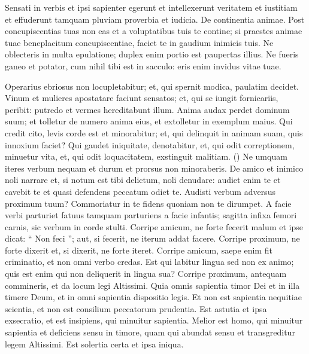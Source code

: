 \begin{biblechapter}
\begin{biblechapter}
\begin{biblechapter}
\begin{biblechapter}
\begin{biblechapter}
\begin{biblechapter}
\begin{biblechapter}
\begin{biblechapter}
\begin{biblechapter}
\begin{biblechapter}
\begin{biblechapter}
\begin{biblechapter}
\begin{biblechapter}
\begin{biblechapter}
\begin{biblechapter}
\begin{biblechapter}
\begin{biblechapter}
\begin{biblechapter}
 \verse Sensati in verbis et ipsi sapienter egerunt
 et intellexerunt veritatem et iustitiam
 et effuderunt tamquam pluviam proverbia et iudicia.
 \verse De continentia animae.
 Post concupiscentias tuas non eas
 et a voluptatibus tuis te contine;
 \verse si praestes animae tuae beneplacitum concupiscentiae,
 faciet te in gaudium inimicis tuis.
 \verse Ne oblecteris in multa epulatione;
 duplex enim portio est paupertas illius.
 \verse Ne fueris ganeo et potator,
 cum nihil tibi est in sacculo:
 eris enim invidus vitae tuae.
 
\begin{biblechapter}
\verse Operarius ebriosus non locupletabitur;
 et, qui spernit modica, paulatim decidet.
 \verse Vinum et mulieres apostatare faciunt sensatos;
 et, qui se iungit fornicariis, peribit:
 putredo et vermes hereditabunt illum.
 \verse Anima audax perdet dominum suum;
 et tolletur de numero anima eius,
 et extolletur in exemplum maius.
 \verse Qui credit cito, levis corde est et minorabitur;
 et, qui delinquit in animam suam, quis innoxium faciet?
 \verse Qui gaudet iniquitate, denotabitur,
 et, qui odit correptionem, minuetur vita,
 et, qui odit loquacitatem, exstinguit malitiam. (\verse)
 \verse Ne umquam iteres verbum nequam et durum
 et prorsus non minoraberis.
 \verse De amico et inimico noli narrare
 et, si notum est tibi delictum, noli denudare:
 \verse audiet enim te et cavebit te
 et quasi defendens peccatum odiet te.
 \verse Audisti verbum adversus proximum tuum?
 Commoriatur in te fidens quoniam non te dirumpet.
 \verse A facie verbi parturiet fatuus
 tamquam parturiens a facie infantis;
 \verse sagitta infixa femori carnis,
 sic verbum in corde stulti.
 \verse Corripe amicum, ne forte fecerit malum et ipse dicat: “ Non feci ”;
 aut, si fecerit, ne iterum addat facere.
 \verse Corripe proximum, ne forte dixerit
 et, si dixerit, ne forte iteret.
 \verse Corripe amicum, saepe enim fit criminatio,
 \verse et non omni verbo credas.
 Est qui labitur lingua sed non ex animo;
 \verse quis est enim qui non deliquerit in lingua sua?
 Corripe proximum, antequam commineris,
 \verse et da locum legi Altissimi.
 Quia omnis sapientia timor Dei et in illa timere Deum,
 et in omni sapientia dispositio legis.
 \verse Et non est sapientia nequitiae scientia,
 et non est consilium peccatorum prudentia.
 \verse Est astutia et ipsa exsecratio,
 et est insipiens, qui minuitur sapientia.
 \verse Melior est homo, qui minuitur sapientia et deficiens sensu in timore,
 quam qui abundat sensu et transgreditur legem Altissimi.
 \verse Est solertia certa et ipsa iniqua.

\end{biblechapter}
\end{biblechapter}
\end{biblechapter}
\end{biblechapter}
\end{biblechapter}
\end{biblechapter}
\end{biblechapter}
\end{biblechapter}
\end{biblechapter}
\end{biblechapter}
\end{biblechapter}
\end{biblechapter}
\end{biblechapter}
\end{biblechapter}
\end{biblechapter}
\end{biblechapter}
\end{biblechapter}
\end{biblechapter}
\end{biblechapter}
